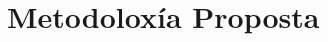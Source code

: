 \documentclass[xcolor=dvipsnames]{beamer}
\begin{document}
\begin{frame}
\end{frame}


\section{Metodoloxía Proposta}
\end{document}
